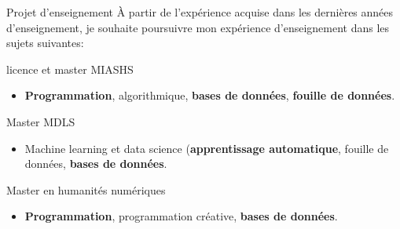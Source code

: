 \begin{frame}{Projet d'enseignement}
À partir de l'expérience acquise dans les dernières années d'enseignement, je souhaite poursuivre mon expérience d’enseignement dans les sujets suivantes:
\begin{block}{licence et master MIASHS}
\begin{itemize}
\item \textbf{Programmation}, algorithmique, \textbf{bases de données}, \textbf{fouille de données}.
\end{itemize}
\end{block}
	
\begin{block}{Master MDLS}
\begin{itemize}
\item Machine learning et data science (\textbf{apprentissage automatique}, fouille de données, \textbf{bases de données}.
\end{itemize}
\end{block}

\begin{block}{Master en humanités numériques}
\begin{itemize}
\item \textbf{Programmation}, programmation créative, \textbf{bases de données}.
\end{itemize}
\end{block}

\end{frame}

